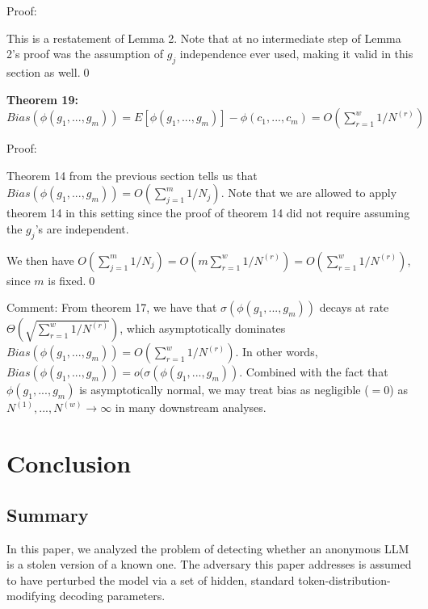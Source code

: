 \documentclass{article}
\begin{document}
Proof:

This is a restatement of Lemma 2. Note that at no intermediate step of Lemma 2's proof was the assumption of $\displaystyle g_{j}$ independence ever used, making it valid in this section as well.\qed 



\textbf{Theorem 19: }$\displaystyle Bias( \phi ( g_{1} ,...,g_{m})) =E[ \phi ( g_{1} ,...,g_{m})] -\phi ( c_{1} ,...,c_{m}) =O\left(\sum _{r=1}^{w} 1/N^{( r)}\right)$

Proof:

Theorem 14 from the previous section tells us that $\displaystyle Bias( \phi ( g_{1} ,...,g_{m})) =O\left(\sum _{j=1}^{m} 1/N_{j}\right)$. Note that we are allowed to apply theorem 14 in this setting since the proof of theorem 14 did not require assuming the $\displaystyle g_{j}$'s are independent.



We then have $\displaystyle O\left(\sum _{j=1}^{m} 1/N_{j}\right) =O\left( m\sum _{r=1}^{w} 1/N^{( r)}\right) =O\left(\sum _{r=1}^{w} 1/N^{( r)}\right)$, since $\displaystyle m$ is fixed.\qed 



Comment: From theorem 17, we have that $\displaystyle \sigma ( \phi ( g_{1} ,...,g_{m}))$ decays at rate $\displaystyle \Theta \left(\sqrt{\sum _{r=1}^{w} 1/N^{( r)}}\right)$, which asymptotically dominates $\displaystyle Bias( \phi ( g_{1} ,...,g_{m})) =O\left(\sum _{r=1}^{w} 1/N^{( r)}\right)$. In other words, $\displaystyle Bias( \phi ( g_{1} ,...,g_{m})) =o( \sigma ( \phi ( g_{1} ,...,g_{m}))$. Combined with the fact that $\displaystyle \phi ( g_{1} ,...,g_{m})$ is asymptotically normal, we may treat bias as negligible ($\displaystyle =0$) as $\displaystyle N^{( 1)} ,...,N^{( w)}\rightarrow \infty $ in many downstream analyses.



\section{Conclusion}
\subsection{Summary}
In this paper, we analyzed the problem of detecting whether an anonymous LLM is a stolen version of a known one. The adversary this paper addresses is assumed to have perturbed the model via a set of hidden, standard token-distribution-modifying decoding parameters.
\end{document}
